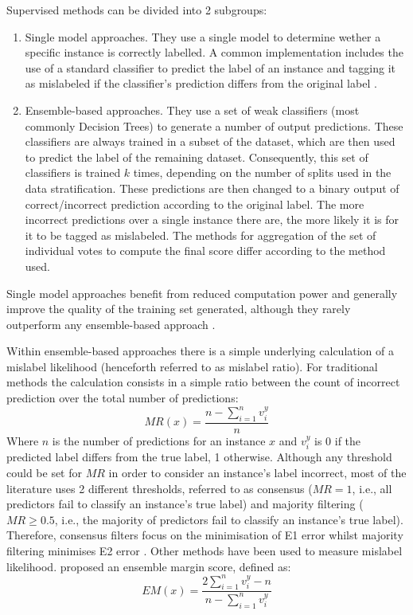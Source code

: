 \documentclass[12pt, english, openany]{book}
\begin{document}
Supervised methods can be divided into 2 subgroups:
\begin{enumerate}
  \item Single model approaches. They use a single model to determine wether a specific
        instance is correctly labelled. A common implementation includes the use of a
        standard classifier to predict the label of an instance and tagging it as
        mislabeled if the classifier's prediction differs from the original label
        \cite{Brodley1999}.
  \item Ensemble-based approaches. They use a set of weak classifiers (most commonly
        Decision Trees) to generate a number of output predictions. These classifiers
        are always trained in a subset of the dataset, which are then used to predict
        the label of the remaining dataset. Consequently, this set of classifiers is
        trained $k$ times, depending on the number of splits used in
        the data stratification. These predictions are then changed to a binary output
        of correct/incorrect prediction according to the original label. The more
        incorrect predictions over a single instance there are, the more likely it is
        for it to be tagged as mislabeled. The methods for aggregation of the set of
        individual votes to compute the final score differ according to the method
        used.
\end{enumerate}

Single model approaches benefit from reduced computation power and generally
improve the quality of the training set generated, although they rarely
outperform any ensemble-based approach \cite{Brodley1999, Garcia-Gil2019, Boukir2019, Pelletier2017Filtering, Zhang2018,
  Yuan2018}.

Within ensemble-based approaches there is a simple underlying calculation of a
mislabel likelihood (henceforth referred to as mislabel ratio). For traditional
methods the calculation consists in a simple ratio between the count of
incorrect prediction over the total number of predictions:
\begin{equation} \label{eq:mislabel-ratio}
  MR(x) = \frac{n-\sum_{i=1}^{n}{v_i^y}}{n}
\end{equation}
Where $n$ is the number of predictions for an instance
$x$ and $v_i^y$ is 0 if the predicted label
differs from the true label, 1 otherwise. Although any threshold could be set
for $MR$ in order to consider an instance's label incorrect,
most of the literature uses 2 different thresholds, referred to as consensus
($MR=1$, i.e., all predictors fail to classify an instance's
true label) and majority filtering ($MR\geq0.5$, i.e., the majority
of predictors fail to classify an instance's true label). Therefore, consensus
filters focus on the minimisation of E1 error whilst majority filtering
minimises E2 error \cite{Brodley1999, Yuan2018}. Other methods have been used to
measure mislabel likelihood. \cite{Boukir2019} proposed an ensemble
margin score, defined as:
\begin{equation} \label{eq:ensemble-margin}
  EM(x) = \frac{2\sum_{i=1}^{n}{v_i^y}-n}{n-\sum_{i=1}^{n}{v_i^y}}
\end{equation}
\end{document}
